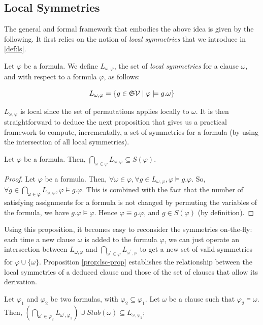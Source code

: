 \subsection{Local Symmetries}
The general and formal framework that embodies the above idea is given by the following. It first relies on the notion of \textit{local symmetries} that we introduce in \cref{def:ls}.
\begin{definition}
 \label{def:ls}
 Let $\varphi$ be a formula. We define $L_{\omega,\varphi}$, 
 the set of \textit{local symmetries} for a clause $\omega$, and with respect to 
 a formula $\varphi$, as follows:
 
 $$L_{\omega,\varphi}=\{g \in \mathfrak{S}{\mathcal{V}}\mid \varphi \models g.\omega\}$$
\end{definition}
$L_{\omega,\varphi}$ is local since the set of permutations applies locally to
$\omega$. It is then straightforward to deduce the next proposition that gives us a
practical framework to compute, incrementally, a set of symmetries for a
formula (by using the intersection of all local symmetries).
\begin{proposition}
 \label{prop:gls-prop}
 Let $\varphi$ be a formula. Then,  $\underset{\omega \in \varphi}{\bigcap}L_{\omega,\varphi} 
 \subseteq S(\varphi)$.
\end{proposition}
\begin{proof}
 Let $\varphi$ be a formula. Then, $\forall \omega \in \varphi, \forall g \in L_{\omega,\varphi}, \varphi \models g.\varphi $. So, $\forall g \in \underset{\omega \in \varphi}{\bigcap}L_{\omega,\varphi}, \varphi \models g.\varphi$. This is combined with the fact that the number of satisfying assignments for a formula is not changed by permuting the variables of the formula, we have $g.\varphi \models \varphi$. Hence $\varphi \equiv g.\varphi$, and $g \in S(\varphi)$ (by definition). 
\end{proof}
Using this proposition, it becomes easy to reconsider the symmetries
on-the-fly: each time a new clause $\omega$ is added to the formula $\varphi$,
we can just operate an intersection between $L_{\omega,\varphi}$ and
$\underset{\omega^\prime \in \varphi}{\bigcap}L_{\omega^\prime,\varphi}$ to get
a new set of valid symmetries for $\varphi \cup \{\omega\}$.
\medskip
Proposition \ref{prop:lsc-prop} establishes the relationship between the local symmetries of a deduced clause and those of the set of clauses that allow its derivation. 
\begin{proposition}
 \label{prop:lsc-prop}
 Let $\varphi_1$ and $\varphi_2$ be two formulas, with $\varphi_2 \subseteq \varphi_1$. 
 Let $\omega$ be a clause such that $\varphi_2 \models \omega$. Then, 
 $(\underset{\omega^\prime \in \varphi_2}{\bigcap}L_{\omega^\prime,\varphi_1})
 \cup Stab(\omega) \subseteq L_{\omega,\varphi_1}$;
\end{proposition} 
